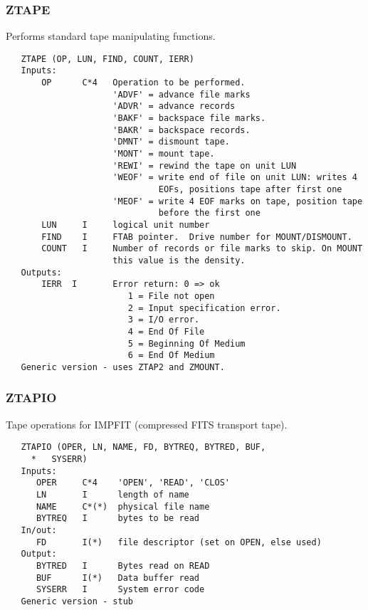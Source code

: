 \subsubsection{ZTAPE}
Performs standard tape manipulating functions.
\begin{verbatim}
   ZTAPE (OP, LUN, FIND, COUNT, IERR)
   Inputs:
       OP      C*4   Operation to be performed.
                     'ADVF' = advance file marks
                     'ADVR' = advance records
                     'BAKF' = backspace file marks.
                     'BAKR' = backspace records.
                     'DMNT' = dismount tape.
                     'MONT' = mount tape.
                     'REWI' = rewind the tape on unit LUN
                     'WEOF' = write end of file on unit LUN: writes 4
                              EOFs, positions tape after first one
                     'MEOF' = write 4 EOF marks on tape, position tape
                              before the first one
       LUN     I     logical unit number
       FIND    I     FTAB pointer.  Drive number for MOUNT/DISMOUNT.
       COUNT   I     Number of records or file marks to skip. On MOUNT
                     this value is the density.
   Outputs:
       IERR  I       Error return: 0 => ok
                        1 = File not open
                        2 = Input specification error.
                        3 = I/O error.
                        4 = End Of File
                        5 = Beginning Of Medium
                        6 = End Of Medium
   Generic version - uses ZTAP2 and ZMOUNT.
\end{verbatim}

\subsubsection{ZTAPIO}
Tape operations for IMPFIT (compressed FITS transport tape).
\begin{verbatim}
   ZTAPIO (OPER, LN, NAME, FD, BYTREQ, BYTRED, BUF,
     *   SYSERR)
   Inputs:
      OPER     C*4    'OPEN', 'READ', 'CLOS'
      LN       I      length of name
      NAME     C*(*)  physical file name
      BYTREQ   I      bytes to be read
   In/out:
      FD       I(*)   file descriptor (set on OPEN, else used)
   Output:
      BYTRED   I      Bytes read on READ
      BUF      I(*)   Data buffer read
      SYSERR   I      System error code
   Generic version - stub
\end{verbatim}

